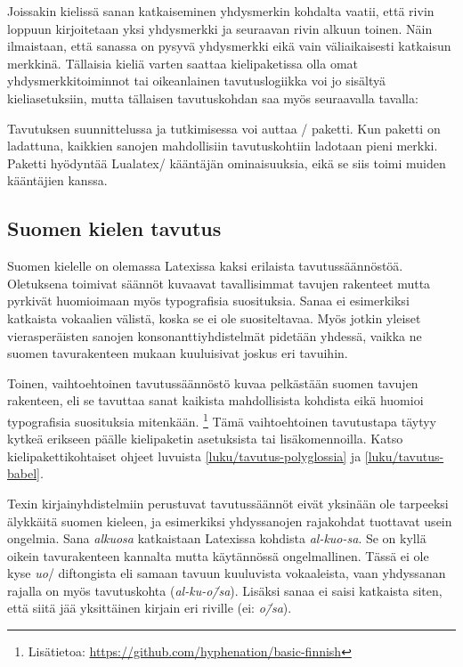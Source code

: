\begin{koodilohkosis}
\discretionary{}{}{}
\end{koodilohkosis}

\noindent
Joissakin kielissä sanan katkaiseminen yhdysmerkin kohdalta vaatii, että
rivin loppuun kirjoitetaan yksi yhdysmerkki ja seuraavan rivin alkuun
toinen. Näin ilmaistaan, että sanassa on pysyvä yhdysmerkki eikä vain
väliaikaisesti katkaisun merkkinä. Tällaisia kieliä varten saattaa
kielipaketissa olla omat yhdysmerkkitoiminnot tai oikeanlainen
tavutuslogiikka voi jo sisältyä kieliasetuksiin, mutta tällaisen
tavutuskohdan saa myös seuraavalla tavalla:

\begin{koodilohkosis}
\discretionary{-}{-}{-}
\end{koodilohkosis}

\noindent
Tavutuksen suunnittelussa ja tutkimisessa voi auttaa
\-/ paketti. Kun paketti on ladattuna,
kaikkien sanojen mahdollisiin tavutuskohtiin ladotaan pieni merkki.
Paketti hyödyntää Lualatex\-/ kääntäjän ominaisuuksia, eikä se siis
toimi muiden kääntäjien kanssa.

\subsection{Suomen kielen tavutus}
\label{luku/suomi-tavutus}

Suomen kielelle on olemassa Latexissa kaksi erilaista tavutussäännöstöä.
Oletuksena toimivat säännöt kuvaavat tavallisimmat tavujen rakenteet
mutta pyrkivät huomioimaan myös typografisia suosituksia. Sanaa ei
esimerkiksi katkaista vokaalien välistä, koska se ei ole suositeltavaa.
Myös jotkin yleiset vierasperäisten sanojen konsonanttiyhdistelmät
pidetään yhdessä, vaikka ne suomen tavurakenteen mukaan kuuluisivat
joskus eri tavuihin.

Toinen, vaihtoehtoinen tavutussäännöstö kuvaa pelkästään suomen tavujen
rakenteen, eli se tavuttaa sanat kaikista mahdollisista kohdista eikä
huomioi typografisia suosituksia mitenkään.%
\footnote{Lisätietoa:
  \url{https://github.com/hyphenation/basic-finnish}} Tämä
vaihtoehtoinen tavutustapa täytyy kytkeä erikseen päälle kielipaketin
asetuksista tai lisäkomennoilla. Katso kielipakettikohtaiset ohjeet
luvuista \ref{luku/tavutus-polyglossia} ja \ref{luku/tavutus-babel}.

Texin kirjainyhdistelmiin perustuvat tavutussäännöt eivät yksinään ole
tarpeeksi älykkäitä suomen kieleen, ja esimerkiksi yhdyssanojen
rajakohdat tuottavat usein ongelmia. Sana \emph{alku\-osa} katkaistaan
Latexissa kohdista \emph{al-kuo-sa}. Se on kyllä oikein tavurakenteen
kannalta mutta käytännössä ongelmallinen. Tässä ei ole kyse \emph{uo}\-/
diftongista eli samaan tavuun kuuluvista vokaaleista, vaan yhdyssanan
rajalla on myös tavutuskohta (\emph{al-ku-o\=/sa}). Lisäksi sanaa ei
saisi katkaista siten, että siitä jää yksittäinen kirjain eri riville
(ei: \emph{o\=/sa}).

